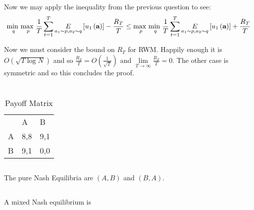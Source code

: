 \documentclass[]{article}
\begin{document}
\noindent Now we may apply the inequality from the previous question to see:
\begin{equation}
	\underset{q}{\text{min }}\underset{p}{\text{max }}\frac{1}{T}\sum_{t=1}^{T}\underset{a_1 \sim p, a_2 \sim q}{E}\left[u_1\left(\textbf{a}\right)\right] - \frac{R_T}{T}
	\le
	\underset{p}{\text{max }}\underset{q}{\text{min }}\frac{1}{T}\sum_{t=1}^{T}\underset{a_1 \sim p, a_2 \sim q}{E}\left[u_1\left(\textbf{a}\right)\right] + \frac{R_T}{T}
\notag
\end{equation}

\noindent Now we must consider the bound on $R_T$ for RWM. Happily enough it is $O\left(\sqrt{T \log N}\right)$ and so $\frac{R_T}{T} = O\left(\frac{1}{\sqrt{T}}\right)$ and $\lim\limits_{T \rightarrow \infty} \frac{R_T}{T} = 0$. The other case is symmetric and so this concludes the proof.
\section{}
\begin{table}[H]
	\centering
	\caption{Payoff Matrix}
	\label{fig:C3}
	\begin{tabular}{lll}
		& A                        & B                        \\ \cline{2-3} 
		\multicolumn{1}{l|}{A} & \multicolumn{1}{l|}{8,8} & \multicolumn{1}{l|}{9,1} \\ \cline{2-3} 
		\multicolumn{1}{l|}{B} & \multicolumn{1}{l|}{9,1} & \multicolumn{1}{l|}{0,0} \\ \cline{2-3} 
	\end{tabular}
\end{table}
\subsection{}
The pure Nash Equilibria are $\left( A, B \right)$ and $\left( B, A \right)$.
\subsection{}
A mixed Nash equilibrium is 
\subsection{}
\end{document}
